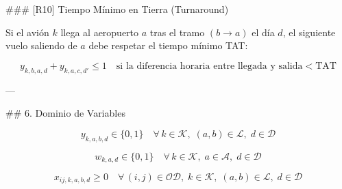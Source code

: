### [R10] Tiempo Mínimo en Tierra (Turnaround)

Si el avión $k$ llega al aeropuerto $a$ tras el tramo $(b \to a)$ el día $d$, el siguiente vuelo saliendo de $a$ debe respetar el tiempo mínimo TAT:

$$
y_{k,b,a,d} + y_{k,a,c,d'} \leq 1 \quad \text{si la diferencia horaria entre llegada y salida} < \text{TAT}
$$

---

## 6. Dominio de Variables

$$
y_{k,a,b,d} \in \{0, 1\} \quad \forall\, k \in \mathcal{K},\; (a,b) \in \mathcal{L},\; d \in \mathcal{D}
$$

$$
w_{k,a,d} \in \{0, 1\} \quad \forall\, k \in \mathcal{K},\; a \in \mathcal{A},\; d \in \mathcal{D}
$$

$$
x_{ij,k,a,b,d} \geq 0 \quad \forall\, (i,j) \in \mathcal{OD},\; k \in \mathcal{K},\; (a,b) \in \mathcal{L},\; d \in \mathcal{D}
$$
